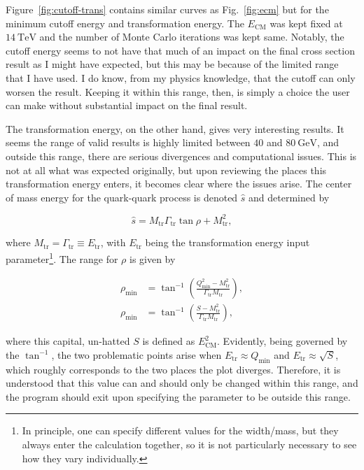 Figure~\ref{fig:cutoff-trans} contains similar curves as Fig.~\ref{fig:ecm} but for the minimum cutoff energy and transformation energy. The $E_{\mathrm{CM}}$ was kept fixed at $\qty{14}{\tera\electronvolt}$ and the number of Monte Carlo iterations was kept same. Notably, the cutoff energy seems to not have that much of an impact on the final cross section result as I might have expected, but this may be because of the limited range that I have used. I do know, from my physics knowledge, that the cutoff can only worsen the result. Keeping it within this range, then, is simply a choice the user can make without substantial impact on the final result.

The transformation energy, on the other hand, gives very interesting results. It seems the range of valid results is highly limited between $40$ and $\qty{80}{\GeV}$, and outside this range, there are serious divergences and computational issues. This is not at all what was expected originally, but upon reviewing the places this transformation energy enters, it becomes clear where the issues arise. The center of mass energy for the quark-quark process is denoted $\hat{s}$ and determined by

\begin{equation}
  \hat{s} = M_{\mathrm{tr}}\Gamma_{\mathrm{tr}} \tan\rho + M_{\mathrm{tr}}^2,
\end{equation}

where $M_{\mathrm{tr}} = \Gamma_{\mathrm{tr}} \equiv E_{\mathrm{tr}}$, with $E_{\mathrm{tr}}$ being the transformation energy input parameter\footnote{In principle, one can specify different values for the width/mass, but they always enter the calculation together, so it is not particularly necessary to see how they vary individually.}. The range for $\rho$ is given by

\begin{align}
  \rho_{\mathrm{min}} &= \tan^{-1}\left( \frac{Q_{\mathrm{min}}^2 - M_{\mathrm{tr}}^2}{\Gamma_{\mathrm{tr}}M_{\mathrm{tr}}} \right), \\
  \rho_{\mathrm{min}} &= \tan^{-1}\left( \frac{S - M_{\mathrm{tr}}^2}{\Gamma_{\mathrm{tr}}M_{\mathrm{tr}}} \right),
\end{align}

where this capital, un-hatted $S$ is defined as $E_{\mathrm{CM}}^2$. Evidently, being governed by the $\tan^{-1}$, the two problematic points arise when $E_{\mathrm{tr}} \approx Q_\mathrm{min}$ and $E_{\mathrm{tr}} \approx \sqrt{S}$, which roughly corresponds to the two places the plot diverges. Therefore, it is understood that this value can and should only be changed within this range, and the program should exit upon specifying the parameter to be outside this range.

